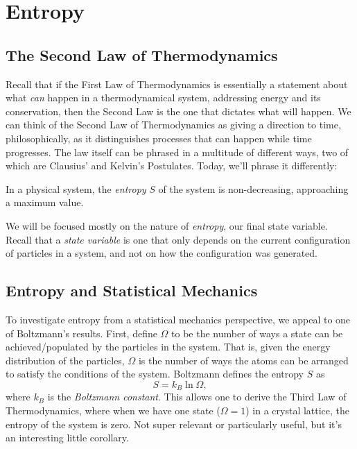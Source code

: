 \section {Entropy}
\subsection{The Second Law of Thermodynamics}
Recall that if the First Law of Thermodynamics is essentially a statement about what \textit{can} happen in a thermodynamical system, addressing energy and its conservation, then the Second Law is the one that dictates what will happen. We can think of the Second Law of Thermodynamics as giving a direction to time, philosophically, as it distinguishes processes that can happen while time progresses. The law itself can be phrased in a multitude of different ways, two of which are Clausius' and Kelvin's Postulates. Today, we'll phrase it differently: 
\begin{law}
In a physical system, the \textit{entropy} $S$ of the system is non-decreasing, approaching a maximum value. 
\end{law}
We will be focused mostly on the nature of \textit{entropy}, our final state variable. Recall that a \textit{state variable} is one that only depends on the current configuration of particles in a system, and not on how the configuration was generated.

\subsection{Entropy and Statistical Mechanics}
To investigate entropy from a statistical mechanics perspective, we appeal to one of Boltzmann's results. First, define $\Omega$ to be the number of ways a state can be achieved/populated by the particles in the system. That is, given the energy distribution of the particles, $\Omega$ is the number of ways the atoms can be arranged to satisfy the conditions of the system. Boltzmann defines the entropy $S$ as 
\[
	S = k_B \ln \Omega,
\]
where $k_B$ is the \textit{Boltzmann constant}.
This allows one to derive the Third Law of Thermodynamics, where when we have one state ($\Omega = 1$) in a crystal lattice, the entropy of the system is zero. Not super relevant or particularly useful, but it's an interesting little corollary. 

